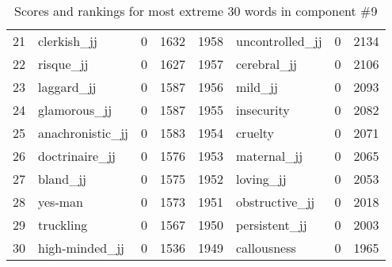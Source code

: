 \begin{table}[tbp]
\begin{tabular}{| rlr@{.}l | rlr@{.}l |}
    21 & clerkish\_jj & 0 & 1632    &    1958 & uncontrolled\_jj & 0 & 2134 \\
    22 & risque\_jj & 0 & 1627    &    1957 & cerebral\_jj & 0 & 2106 \\
    23 & laggard\_jj & 0 & 1587    &    1956 & mild\_jj & 0 & 2093 \\
    24 & glamorous\_jj & 0 & 1587    &    1955 & insecurity & 0 & 2082 \\
    25 & anachronistic\_jj & 0 & 1583    &    1954 & cruelty & 0 & 2071 \\
    26 & doctrinaire\_jj & 0 & 1576    &    1953 & maternal\_jj & 0 & 2065 \\
    27 & bland\_jj & 0 & 1575    &    1952 & loving\_jj & 0 & 2053 \\
    28 & yes-man & 0 & 1573    &    1951 & obstructive\_jj & 0 & 2018 \\
    29 & truckling & 0 & 1567    &    1950 & persistent\_jj & 0 & 2003 \\
    30 & high-minded\_jj & 0 & 1536    &    1949 & callousness & 0 & 1965 \\
    \hline
    \end{tabular}
    \caption{Scores and rankings for most extreme 30 words in component \#9} 
\end{table}
\clearpage
